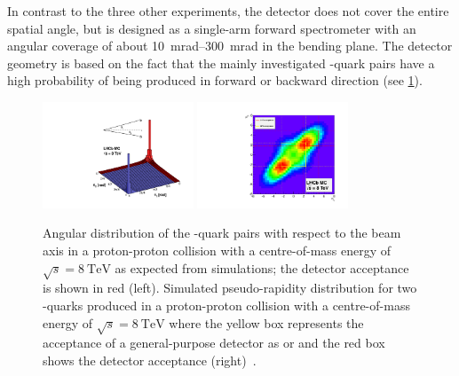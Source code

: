 In contrast to the three other experiments, the \lhcb detector does not cover the entire spatial angle, but is designed as a single-arm forward spectrometer with an angular coverage of about \SIrange[range-units=single]{10}{300}{\milli\radian} in the bending plane.
The detector geometry is based on the fact that the mainly investigated \bbbar-quark pairs have a high probability of being produced in forward or backward direction (see \cref{fig:anglePlots}).
\begin{figure}[tbp]
    \centering
    \includegraphics[width=0.4\textwidth]{05lhcb/figs/bbbarCorrelation_angle.pdf}
    \includegraphics[width=0.4\textwidth]{05lhcb/figs/bbbarCorrelation_rapidity.pdf}
    \caption{Angular distribution of the \bbbar-quark pairs with respect to the beam axis in a proton-proton collision with a centre-of-mass energy of $\sqrt{s}=\SI{8}{\tera\electronvolt}$ as expected from simulations; the \lhcb detector acceptance is shown in red (left).
    Simulated pseudo-rapidity distribution for two \bquark-quarks produced in a proton-proton collision with a centre-of-mass energy of $\sqrt{s}=\SI{8}{\tera\electronvolt}$ where the yellow box represents the acceptance of a general-purpose detector as \cms or \atlas and the red box shows the \lhcb detector acceptance (right)~\cite{angle_plots}.}
    \label{fig:anglePlots}
\end{figure}
